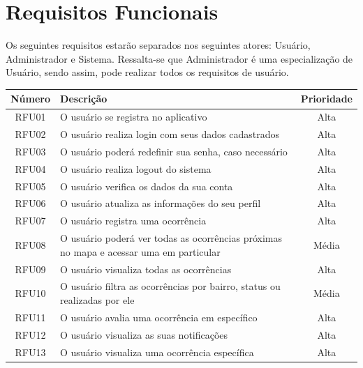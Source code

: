 
\chapter{Requisitos Funcionais}
Os seguintes requisitos estarão separados nos seguintes atores: Usuário, Administrador e Sistema. Ressalta-se que Administrador é uma especialização de Usuário, sendo assim, pode realizar todos os requisitos de usuário.


\begin{quadro}[htb]
	\caption{\label{requisitos_funcionais_user}Requisitos Funcionais de Usuário}
	\begin{tabular}{|c|>{\centering\arraybackslash}m{9cm}|c|}
		\hline
		\textbf{Número} & \textbf{Descrição} & \textbf{Prioridade}\\\hline
			RFU01 & O usuário se registra no aplicativo & Alta \\ \hline
		RFU02 & O usuário realiza login com seus dados cadastrados & Alta \\ \hline
		RFU03 & O usuário poderá redefinir sua senha, caso necessário & Alta \\ \hline
		RFU04 & O usuário realiza logout do sistema & Alta \\ \hline
		RFU05 & O usuário verifica os dados da sua conta & Alta \\ \hline
		RFU06 & O usuário atualiza as informações do seu perfil & Alta \\ \hline
		RFU07 & O usuário registra uma ocorrência & Alta \\ \hline
		RFU08 & O usuário poderá ver todas as ocorrências próximas no mapa e acessar uma em particular & Média \\ \hline
		RFU09 & O usuário visualiza todas as ocorrências & Alta \\ \hline
		RFU10 & O usuário filtra as ocorrências por bairro, status ou realizadas por ele & Média \\ \hline
		RFU11 & O usuário avalia uma ocorrência em específico & Alta \\ \hline
		RFU12 & O usuário visualiza as suas notificações & Alta \\ \hline
		RFU13 & O usuário visualiza uma ocorrência específica & Alta \\ \hline
	\end{tabular}
\end{quadro}

